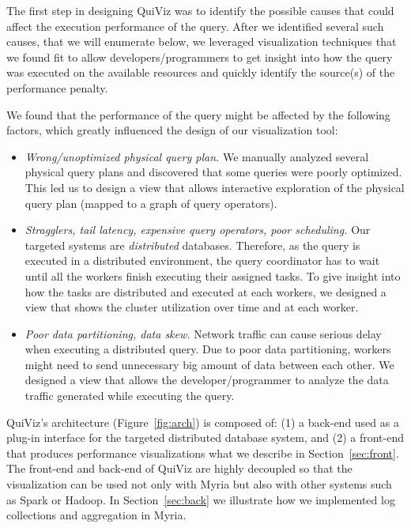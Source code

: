 \documentclass{chi2009}
\newcommand*{\system}{QuiViz\xspace}
\begin{document}

The first step in designing \system was to identify the possible causes that
could affect the execution performance of the query. After we identified
several such causes, that we will enumerate below, we leveraged visualization
techniques that we found fit to allow developers/programmers to get insight
into how the query was executed on the available resources and quickly
identify the source(s) of the performance penalty.

We found that the performance of the query might be affected by the following
factors, which greatly influenced the design of our visualization tool:
\begin{itemize}
   \item \emph{Wrong/unoptimized physical query plan.} We manually analyzed
several physical query plans and discovered that some queries were poorly
optimized. This led us to design a view that allows interactive exploration of
the physical query plan (mapped to a graph of query operators).
   \item \emph{Stragglers, tail latency, expensive query operators, poor
scheduling.} Our targeted systems are \emph{distributed} databases. Therefore,
as the query is executed in a distributed environment, the query coordinator
has to wait until all the workers finish executing their assigned tasks. To
give insight into how the tasks are distributed and executed at each workers,
we designed a view that shows the cluster utilization over time and at each
worker.
   \item \emph{Poor data partitioning, data skew.} Network traffic can cause
serious delay when executing a distributed query. Due to poor data
partitioning, workers might need to send unnecessary big amount of data between
each other. We designed a view that allows the developer/programmer to analyze
the data traffic generated while executing the query.
\end{itemize}


\system's architecture (Figure~\ref{fig:arch}) is composed of: (1) a back-end
used as a plug-in interface for the targeted distributed database system, and (2) a
front-end that produces performance visualizations what we describe in Section~\ref{sec:front}. The front-end and
back-end of \system are highly decoupled so that the visualization can be used not only with
Myria but also with other systems such as Spark or Hadoop. In
Section~\ref{sec:back} we illustrate how we implemented log collections and
aggregation in Myria.
\end{document}
